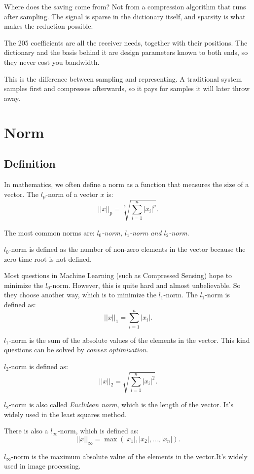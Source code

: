 \documentclass[10pt,a4paper,oneside,numbers=noenddot]{scrbook}
\theoremstyle{ctplain}
\theoremstyle{ctresult}
\begin{document}
Where does the saving come from? Not from a compression algorithm that runs after sampling.
The signal is sparse in the dictionary itself, and sparsity is what makes the reduction possible.

The 205 coefficients are all the receiver needs, together with their positions. The dictionary and
the basis behind it are design parameters known to both ends, so they never cost you bandwidth.

This is the difference between sampling and representing. A traditional system samples first and
compresses afterwards, so it pays for samples it will later throw away.

\section{Norm}

\subsection{Definition}

In mathematics, we often define a norm as a function that measures the size of a vector.
The $l_p$-norm of a vector $x$ is:
\[
  ||x||_p = \sqrt[p]{\sum_{i=1}^{n} |x_i|^p}.
\]

The most common norms are: \emph{$l_0$-norm, $l_1$-norm and $l_2$-norm}.

$l_0$-norm is defined as the number of non-zero elements in the vector because the zero-time
root is not defined.

Most questions in Machine Learning (such as Compressed Sensing) hope to minimize the
$l_0$-norm. However, this is quite hard and almost unbelievable. So they choose another
way, which is to minimize the $l_1$-norm. The $l_1$-norm is defined as:
\[
  ||x||_1 = \sum_{i=1}^{n} |x_i|.
\]

$l_1$-norm is the sum of the absolute values of the elements in the vector. This kind
questions can be solved by \emph{convex optimization}.

$l_2$-norm is defined as:
\[
  ||x||_2 = \sqrt{\sum_{i=1}^{n} |x_i|^2}.
\]

$l_2$-norm is also called \emph{Euclidean norm}, which is the length of the vector.
It's widely used in the least squares method.

There is also a $l_{\infty}$-norm, which is defined as:
\[
  ||x||_{\infty} = \max(|x_1|, |x_2|, \ldots, |x_n|).
\]

$l_{\infty}$-norm is the maximum absolute value of the elements in the vector.It's widely
used in image processing.
\end{document}
